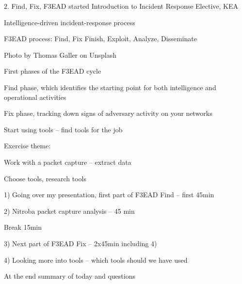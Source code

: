 \documentclass[Screen16to9,17pt]{foils}
\begin{document}
\mytitlepage
{2. Find, Fix, F3EAD started}
{Introduction to Incident Response Elective, KEA}




\begin{list2}
\item Intelligence-driven incident-response process
\item F3EAD process: Find, Fix Finish, Exploit, Analyze, Disseminate
\end{list2}

{\hfill \small Photo by Thomas Galler on Unsplash}


\begin{list2}
\item First phases of the F3EAD cycle
\item Find phase, which identifies the starting point for both
intelligence and operational activities
\item Fix phase, tracking down signs of adversary activity on your networks
\item Start using tools -- find tools for the job
\end{list2}

Exercise theme:
\begin{list2}
\item Work with a packet capture -- extract data
\item Choose tools, research tools
\end{list2}


\begin{list2}
\item 1) Going over my presentation, first part of F3EAD Find -- first 45min
\item 2) Nitroba packet capture analysis -- 45 min
\item Break 15min
\item 3) Next part of F3EAD Fix -- 2x45min including 4)
\item 4) Looking more into tools -- which tools should we have used
\item At the end summary of today and questions
\end{list2}
\end{document}
